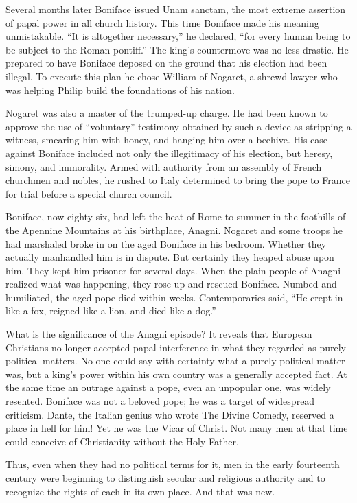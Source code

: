 Several months later Boniface issued Unam sanctam, the most extreme assertion of papal power in all
church history. This time Boniface made his meaning unmistakable. “It is altogether necessary,” he
declared, “for every human being to be subject to the Roman pontiff.” The king’s countermove was no
less drastic. He prepared to have Boniface deposed on the ground that his election had been illegal.
To execute this plan he chose William of Nogaret, a shrewd lawyer who was helping Philip build the
foundations of his nation.

Nogaret was also a master of the trumped-up charge. He had been known to approve the use of
“voluntary” testimony obtained by such a device as stripping a witness, smearing him with honey, and
hanging him over a beehive. His case against Boniface included not only the illegitimacy of his
election, but heresy, simony, and immorality. Armed with authority from an assembly of French
churchmen and nobles, he rushed to Italy determined to bring the pope to France for trial before a
special church council.

Boniface, now eighty-six, had left the heat of Rome to summer in the foothills of the Apennine
Mountains at his birthplace, Anagni. Nogaret and some troops he had marshaled broke in on the aged
Boniface in his bedroom. Whether they actually manhandled him is in dispute. But certainly they
heaped abuse upon him. They kept him prisoner for several days. When the plain people of Anagni
realized what was happening, they rose up and rescued Boniface. Numbed and humiliated, the aged pope
died within weeks. Contemporaries said, “He crept in like a fox, reigned like a lion, and died like
a dog.”

What is the significance of the Anagni episode? It reveals that European Christians no longer
accepted papal interference in what they regarded as purely political matters. No one could say with
certainty what a purely political matter was, but a king’s power within his own country was a
generally accepted fact. At the same time an outrage against a pope, even an unpopular one, was
widely resented. Boniface was not a beloved pope; he was a target of widespread criticism. Dante,
the Italian genius who wrote The Divine Comedy, reserved a place in hell for him! Yet he was the
Vicar of Christ. Not many men at that time could conceive of Christianity without the Holy Father.

Thus, even when they had no political terms for it, men in the early fourteenth century were
beginning to distinguish secular and religious authority and to recognize the rights of each in its
own place. And that was new.

